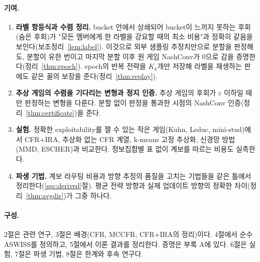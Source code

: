 \paragraph{기여.}
\begin{enumerate}
  \item \textbf{라벨 항등식과 수렴 정리.} bucket 안에서 상쇄되어 bucket이 느끼지 못하는 후회(숨은 후회)가 "모든 멤버에게 한 라벨을 강요할 때의 최소 비용"과 정확히 같음을 보인다(보조정리~\ref{lem:label}).
    이것으로 외부 샘플링 추정치만으로 분할을 판정해도, 분할이 유한 번이고 마지막 분할 이후 원 게임 NashConv가 0으로 감을 증명한다(정리~\ref{thm:epoch}).
    epoch의 반복 전략을 $K_k$개만 저장해 라벨을 재생하는 판에도 같은 꼴의 보장을 준다(정리~\ref{thm:replay}).
  \item \textbf{추상 게임의 수렴을 기다리는 변형과 정지 인증.} 추상 게임의 후회가 $\varepsilon$ 이하일 때만 판정하는 변형을 다룬다. 분할 없이 판정을 통과한 시점의 NashConv 인증(정리~\ref{thm:certificate})을 준다.
  \item \textbf{실험.} 정확한 exploitability를 잴 수 있는 작은 게임(Kuhn, Leduc, mini-stud)에서 CFR+IRA, 추상화 없는 CFR 계열, k-means 고정 추상화, 신경망 방법(MMD, ESCHER)과 비교한다.
    정보집합별 표 없이 계보를 따르는 비용도 실측한다.
  \item \textbf{파생 기법.} 계보 라우팅 비용과 방향 추정의 품질을 고치는 기법들을 같은 틀에서 정리한다(\ref{sec:derived}절). 평균 전략 방향과 실제 업데이트 방향의 정확한 차이(정리~\ref{thm:avgdir})가 그중 하나다.
\end{enumerate}

\paragraph{구성.}
2절은 관련 연구, 3절은 배경(CFR, MCCFR, CFR+IRA의 정리)이다.
4절에서 순수 ASWISS를 정의하고, 5절에서 이론 결과를 정리한다. 증명은 부록 A에 있다.
6절은 실험, 7절은 파생 기법, 8절은 한계와 후속 연구다.
